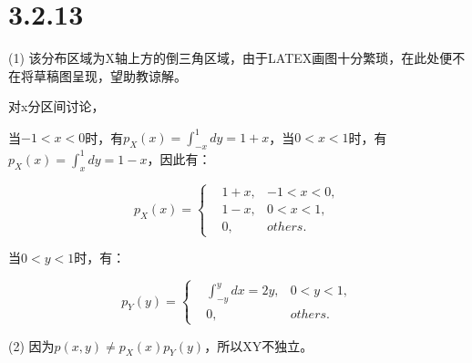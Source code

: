\documentclass{article}
\begin{document}
\section{3.2.13}
(1)
该分布区域为X轴上方的倒三角区域，由于LATEX画图十分繁琐，在此处便不在将草稿图呈现，望助教谅解。

对x分区间讨论，

当$-1<x<0$时，有$p_X(x)=\int^1_{-x}dy=1+x$，当$0<x<1$时，有$p_X(x)=\int^1_{x}dy=1-x$，因此有：

\begin{equation}
p_X(x)=\left\{
\begin{aligned}
&1+x,&-1<x<0,\\
&1-x,&0<x<1,\\
&0,&others.
\end{aligned}
\right.
\end{equation}

当$0<y<1$时，有：

\begin{equation}
p_Y(y)=\left\{
\begin{aligned}
&\int^{y}_{-y}dx=2y,&0<y<1,\\
&0,&others.
\end{aligned}
\right.
\end{equation}

(2)
因为$p(x,y)\neq p_X(x)p_Y(y) $，所以XY不独立。




\end{document}
